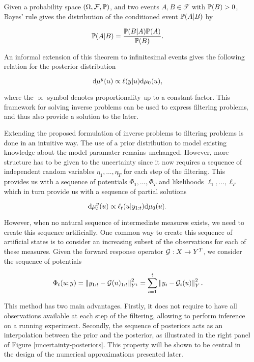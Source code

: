 Given a probability space $(\Omega, \mathcal{F}, \P)$, and two events $A, B \in \mathcal{F}$ with $\P(B) > 0$, Bayes' rule gives the distribution of the conditioned event $\P(A|B)$ by

\begin{equation*}
  \P(A|B) = \frac{\P(B|A)\P(A)}{\P(B)}.
\end{equation*}

An informal extension of this theorem to infinitesimal events gives the following relation for the posterior distribution 

\begin{equation}\label{bayes-rule}
  \d\mu^y(u) \propto \ell(y|u)\d\mu_0(u),
\end{equation}

where the $\propto$ symbol denotes proportionality up to a constant factor. This framework for solving inverse problems can be used to express filtering problems, and thus also provide a solution to the later. 

Extending the proposed formulation of inverse problems to filtering problems is done in an intuitive way. The use of a prior distribution to model existing knowledge about the model paramater remains unchanged. However, more structure has to be given to the uncertainty since it now requires a sequence of independent random variables $\eta_1, \ldots, \eta_T$ for each step of the filtering. This provides us with a sequence of potentials $\Phi_1, \ldots, \Phi_T$ and likelihoods $\ell_1, \ldots, \ell_T$ which in turn provide us with a sequence of partial solutions

\begin{equation*}
  \d\mu_t^y(u) \propto \ell_t(u|y_{1:t})\d\mu_0(u).
\end{equation*}

However, when no natural sequence of intermediate measures exists, we need to create this sequence artificially. One common way to create this sequence of artificial states is to consider an increasing subset of the observations for each of these measures. Given the forward response operator $\G : X \rightarrow Y^T$, we consider the sequence of potentials

\begin{equation}\label{phi-seq}
  \Phi_t(u; y) = \norm{y_{1:t} - \G(u)_{1:t}}_{Y^t}^2 = \sum_{i=1}^t\norm{y_i - \G_i(u)}_Y^2.
\end{equation}

This method has two main advantages. Firstly, it does not require to have all observations available at each step of the filtering, allowing to perform inference on a running experiment. Secondly, the sequence of posteriors acts as an interpolation between the prior and the posterior, as illustrated in the right panel of Figure \ref{uncertainty-posteriors}. This property will be shown to be central in the design of the numerical approximations presented later.

